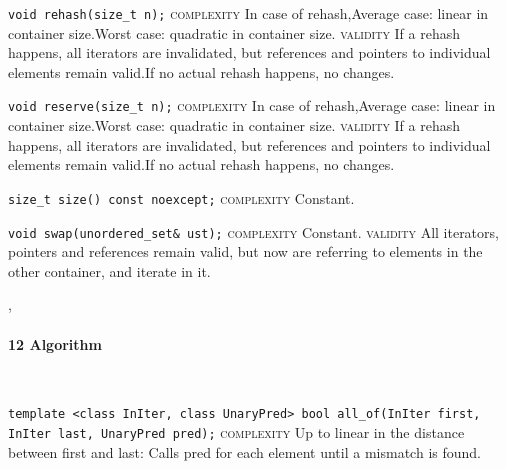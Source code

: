 \noindent{}\hspace*{0.25em}\lstinline[basicstyle=\ttfamily\color{corange}]{void rehash(size_t n);} \textsc{complexity} In case of rehash,Average case: linear in container size.Worst case: quadratic in container size. \textsc{validity} If a rehash happens, all iterators are invalidated, but references and pointers to individual elements remain valid.If no actual rehash happens, no changes.\\\vspace{-0.6em}

\noindent{}\hspace*{0.25em}\lstinline[basicstyle=\ttfamily\color{corange}]{void reserve(size_t n);} \textsc{complexity} In case of rehash,Average case: linear in container size.Worst case: quadratic in container size. \textsc{validity} If a rehash happens, all iterators are invalidated, but references and pointers to individual elements remain valid.If no actual rehash happens, no changes.\\\vspace{-0.6em}

\noindent{}\hspace*{0.25em}\lstinline[basicstyle=\ttfamily\color{cgreen}]{size_t size() const noexcept;} \textsc{complexity} Constant.\\\vspace{-0.6em}

\noindent{}\hspace*{0.25em}\lstinline[basicstyle=\ttfamily\color{cgreen}]{void swap(unordered_set& ust);} \textsc{complexity} Constant. \textsc{validity} All iterators, pointers and references remain valid, but now are referring to elements in the other container, and iterate in it.\\\vspace{-0.6em}


\sep
{}
\paragraph{12 Algorithm}\mbox{}\vspace{0.5em}\\
\noindent{}\hspace*{0.25em}\lstinline[basicstyle=\ttfamily\color{corange}]{template <class InIter, class UnaryPred> bool all_of(InIter first, InIter last, UnaryPred pred);} \textsc{complexity} Up to linear in the distance between first and last: Calls pred for each element until a mismatch is found.\\\vspace{-0.6em}

